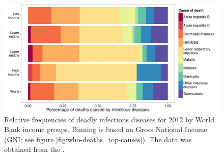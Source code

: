\begin{knitrout}
\color{fgcolor}\begin{figure}
\includegraphics[width=\maxwidth]{figures/R/who-deaths/byDisease-who-deaths_by-disease-1} \caption[Relative frequencies deadly infectious diseases for 2012 by World Bank income groups]{Relative frequencies of deadly infectious diseases for 2012 by World Bank income groups. Binning is based on Gross National Income (GNI; see figure \ref{fig:who-deaths_top-causes}). The data was obtained from the \cite{WHO2012}.}\label{fig:who-deaths_by-disease}
\end{figure}


\end{knitrout}

\newcommand{\knitrPercentageInfectTwelveWorldLRI}{34.5\%}
\newcommand{\knitrPercentageInfectTwelveHighLRI}{57.7\%}
\newcommand{\knitrPercentageInfectTwelveUmidLRI}{43.5\%}
\newcommand{\knitrPercentageInfectTwelveLmidLRI}{30.8\%}
\newcommand{\knitrPercentageInfectTwelveLowLRI}{28.7\%}
\newcommand{\knitrPercentageInfectTwelveHighDiarr}{5.6\%}
\newcommand{\knitrPercentageInfectTwelveUmidDiarr}{7\%}
\newcommand{\knitrPercentageInfectTwelveLmidDiarr}{21.4\%}
\newcommand{\knitrPercentageInfectTwelveLowDiarr}{16.6\%}
\newcommand{\knitrPercentageInfectTwelveWorldAIDS}{17.3\%}
\newcommand{\knitrPercentageInfectTwelveWorldDiarr}{16.9\%}
\newcommand{\knitrPercentageInfectTwelveHighAIDS}{11.3\%}
\newcommand{\knitrPercentageInfectTwelveUmidAIDS}{26.2\%}
\newcommand{\knitrPercentageInfectTwelveLmidAIDS}{13.3\%}
\newcommand{\knitrPercentageInfectTwelveLowAIDS}{20.4\%}
